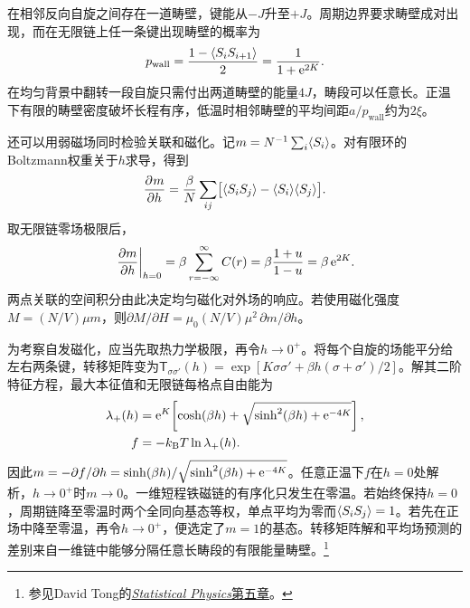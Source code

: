 在相邻反向自旋之间存在一道畴壁，键能从$-J$升至$+J$。周期边界要求畴壁成对出现，而在无限链上任一条键出现畴壁的概率为
\begin{equation}
	\label{eq:sm-ising-domain-wall-probability}
	p_{\mathrm{wall}} = \frac{1 - \langle S_iS_{i+1}\rangle}{2} = \frac{1}{1 + \mathop{}\!\mathrm{e}^{2K}} .
\end{equation}
在均匀背景中翻转一段自旋只需付出两道畴壁的能量$4J$，畴段可以任意长。正温下有限的畴壁密度破坏长程有序，低温时相邻畴壁的平均间距$a/p_{\mathrm{wall}}$约为$2\xi$。

还可以用弱磁场同时检验关联和磁化。记$\textstyle m = N^{-1}\sum_i\langle S_i\rangle$。对有限环的Boltzmann权重关于$h$求导，得到
\begin{equation}
	\label{eq:sm-finite-spin-response}
	\frac{\partial^{}m}{\partial{h}^{}} = \frac{\beta}{N}\sum_{ij}\bigl[\langle S_i S_j\rangle - \langle S_i\rangle\langle S_j\rangle\bigr].
\end{equation}
取无限链零场极限后，
\begin{equation}
	\label{eq:sm-ising-chain-susceptibility}
	\left.\frac{\partial m}{\partial h}\right|_{h=0}
	= \beta\sum_{r=-\infty}^{\infty}C(r)
	= \beta\frac{1 + u}{1 - u} = \beta\mathop{}\!\mathrm{e}^{2K} .
\end{equation}
两点关联的空间积分由此决定均匀磁化对外场的响应。若使用磁化强度$M = (N/V)\mu m$，则$\partial M/\partial H = \mu_0(N/V)\mu^2\,\partial m/\partial h$。

为考察自发磁化，应当先取热力学极限，再令$h \to 0^+$。将每个自旋的场能平分给左右两条键，转移矩阵变为$\mathsf T_{\sigma\sigma'}(h) = \exp[K\sigma\sigma' + \beta h(\sigma + \sigma')/2]$。解其二阶特征方程，最大本征值和无限链每格点自由能为
\begin{subequations}
	\label{eq:sm-ising-field-free-energy}
	\begin{align}
		\lambda_+(h) &= \mathop{}\!\mathrm{e}^K\!\left[\cosh(\beta h) + \sqrt{\sinh^2(\beta h) + \mathop{}\!\mathrm{e}^{-4K}}\right],\\
		f &= -k_{\mathrm{B}} T\ln\lambda_+(h).
	\end{align}
\end{subequations}
因此$m = -\partial f/\partial h = \sinh(\beta h)/\sqrt{\sinh^2(\beta h) + \mathop{}\!\mathrm{e}^{-4K}}$。任意正温下$f$在$h = 0$处解析，$h \to 0^+$时$m \to 0$。一维短程铁磁链的有序化只发生在零温。若始终保持$h = 0$，周期链降至零温时两个全同向基态等权，单点平均为零而$\langle S_iS_j\rangle = 1$。若先在正场中降至零温，再令$h \to 0^+$，便选定了$m = 1$的基态。转移矩阵解和平均场预测的差别来自一维链中能够分隔任意长畴段的有限能量畴壁。\footnote{参见David Tong的\href{https://davidtong.org/teaching/statistical-physics/statmechhtml/S5}{\textit{Statistical Physics}第五章}。}

